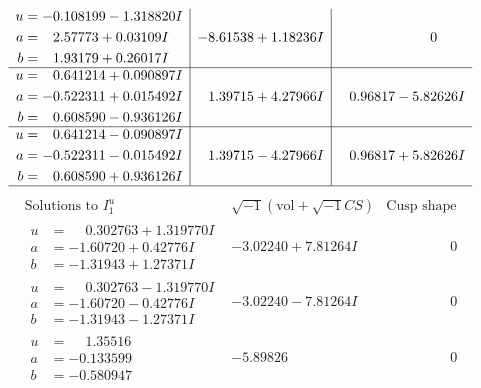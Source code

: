 \documentclass[1p]{elsarticle_modified}
\theoremstyle{definition}
\newcommand{\I}{\sqrt{-1}}
\begin{document}
$$\begin{array}{c|c|c}
\begin{aligned}
u &= -0.108199 - 1.318820 I \\
a &= \phantom{-}2.57773 + 0.03109 I \\
b &= \phantom{-}1.93179 + 0.26017 I\end{aligned}
 & -8.61538 + 1.18236 I & \phantom{-0.000000 } 0 \\ \hline\begin{aligned}
u &= \phantom{-}0.641214 + 0.090897 I \\
a &= -0.522311 + 0.015492 I \\
b &= \phantom{-}0.608590 - 0.936126 I\end{aligned}
 & \phantom{-}1.39715 + 4.27966 I & \phantom{-}0.96817 - 5.82626 I \\ \hline\begin{aligned}
u &= \phantom{-}0.641214 - 0.090897 I \\
a &= -0.522311 - 0.015492 I \\
b &= \phantom{-}0.608590 + 0.936126 I\end{aligned}
 & \phantom{-}1.39715 - 4.27966 I & \phantom{-}0.96817 + 5.82626 I\\
 \hline 
 \end{array}$$\newpage$$\begin{array}{c|c|c}  
\text{Solutions to }I^u_{1}& \I (\text{vol} + \sqrt{-1}CS) & \text{Cusp shape}\\
 \hline 
\begin{aligned}
u &= \phantom{-}0.302763 + 1.319770 I \\
a &= -1.60720 + 0.42776 I \\
b &= -1.31943 + 1.27371 I\end{aligned}
 & -3.02240 + 7.81264 I & \phantom{-0.000000 } 0 \\ \hline\begin{aligned}
u &= \phantom{-}0.302763 - 1.319770 I \\
a &= -1.60720 - 0.42776 I \\
b &= -1.31943 - 1.27371 I\end{aligned}
 & -3.02240 - 7.81264 I & \phantom{-0.000000 } 0 \\ \hline\begin{aligned}
u &= \phantom{-}1.35516\phantom{ +0.000000I} \\
a &= -0.133599\phantom{ +0.000000I} \\
b &= -0.580947\phantom{ +0.000000I}\end{aligned}
 & -5.89826\phantom{ +0.000000I} & \phantom{-0.000000 } 0 \\ \hline\begin{aligned}

\end{aligned}
\end{array}$$
\end{document}
